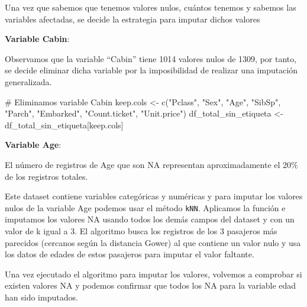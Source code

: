 \documentclass[
]{article}
\newenvironment{Shaded}{\begin{snugshade}}{\end{snugshade}}
\newcommand{\CommentTok}[1]{\textcolor[rgb]{0.50,0.62,0.50}{#1}}
\newcommand{\DataTypeTok}[1]{\textcolor[rgb]{0.87,0.87,0.75}{#1}}
\newcommand{\DecValTok}[1]{\textcolor[rgb]{0.86,0.86,0.80}{#1}}
\newcommand{\KeywordTok}[1]{\textcolor[rgb]{0.94,0.87,0.69}{#1}}
\newcommand{\NormalTok}[1]{\textcolor[rgb]{0.80,0.80,0.80}{#1}}
\newcommand{\OperatorTok}[1]{\textcolor[rgb]{0.94,0.94,0.82}{#1}}
\newcommand{\StringTok}[1]{\textcolor[rgb]{0.80,0.58,0.58}{#1}}
\begin{document}
Una vez que sabemos que tenemos valores nulos, cuántos tenemos y sabemos
las variables afectadas, se decide la estrategia para imputar dichos
valores

\textbf{Variable Cabin}:

Observamos que la variable ``Cabin'' tiene 1014 valores nulos de 1309,
por tanto, se decide eliminar dicha variable por la imposibilidad de
realizar una imputación generalizada.

\begin{Shaded}
\begin{Highlighting}[]
\CommentTok{# Eliminamos variable Cabin}
\NormalTok{keep.cols <-}\StringTok{ }\KeywordTok{c}\NormalTok{(}\StringTok{"Pclass"}\NormalTok{, }\StringTok{"Sex"}\NormalTok{, }\StringTok{"Age"}\NormalTok{, }\StringTok{"SibSp"}\NormalTok{, }\StringTok{"Parch"}\NormalTok{, }\StringTok{"Embarked"}\NormalTok{, }\StringTok{"Count.ticket"}\NormalTok{, }\StringTok{"Unit.price"}\NormalTok{)}
\NormalTok{df_total_sin_etiqueta <-}\StringTok{ }\NormalTok{df_total_sin_etiqueta[keep.cols]}
\end{Highlighting}
\end{Shaded}

\textbf{Variable Age}:

El número de registros de Age que son NA representan aproximadamente el
20\% de los registros totales.

Este dataset contiene variables categóricas y numéricas y para imputar
los valores nulos de la variable Age podemos usar el método
\texttt{kNN}. Aplicamos la función e imputamos los valores NA usando
todos los demás campos del dataset y con un valor de k igual a 3. El
algoritmo busca los registros de los 3 pasajeros más parecidos (cercanos
según la distancia Gower) al que contiene un valor nulo y usa los datos
de edades de estos pasajeros para imputar el valor faltante.

Una vez ejecutado el algoritmo para imputar los valores, volvemos a
comprobar si existen valores NA y podemos confirmar que todos los NA
para la variable edad han sido imputados.

\begin{Shaded}
\end{Shaded}
\end{document}
